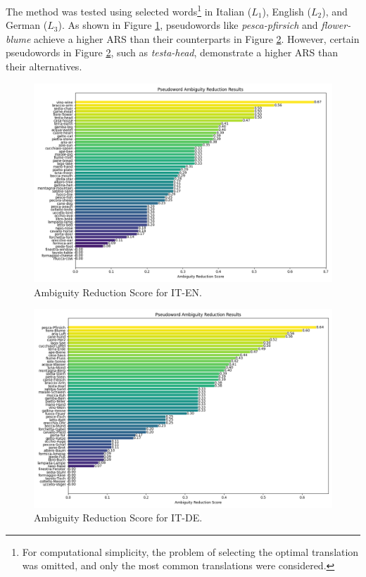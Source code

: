 \documentclass[runningheads]{llncs}
\begin{document}
The method was tested using selected words\footnote{For computational simplicity, the problem of selecting the optimal translation was omitted, and only the most common translations were considered.} in Italian ($L_1$), English ($L_2$), and German ($L_3$). As shown in Figure \ref{fig:1}, pseudowords like \textit{pesca-pfirsich} and \textit{flower-blume} achieve a higher ARS than their counterparts in Figure \ref{fig:2}. However, certain pseudowords in Figure \ref{fig:2}, such as \textit{testa-head}, demonstrate a higher ARS than their alternatives.

\begin{figure}[!h]
    \centering
    \includegraphics[scale=0.45]{ambiguity_reduction_plot_IT_EN.png}
    \caption{Ambiguity Reduction Score for IT-EN.}
    \label{fig:1}
\end{figure}
\begin{figure}[!h]
    \centering
    \includegraphics[scale=0.45]{ambiguity_reduction_plot_IT_DE.png}
    \caption{Ambiguity Reduction Score for IT-DE.}
    \label{fig:2}
\end{figure}
\end{document}
